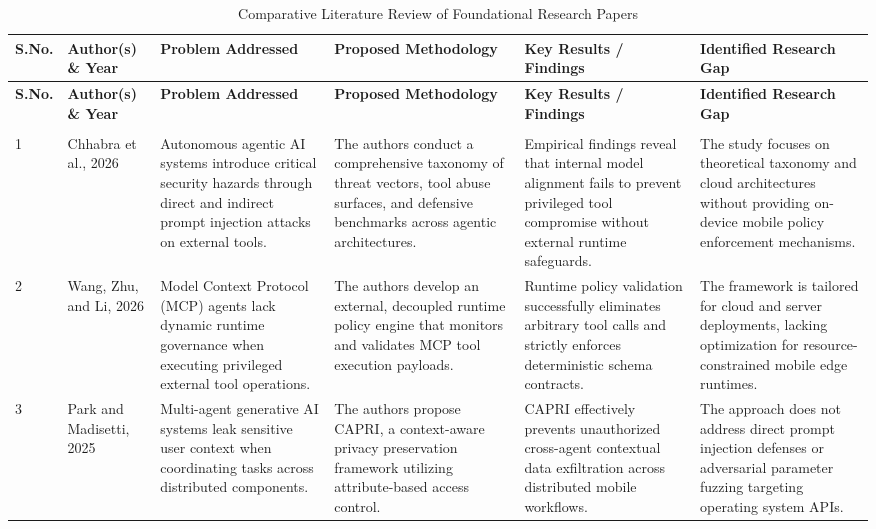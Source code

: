 \begin{center}
\footnotesize
\setlength{\tabcolsep}{2.2pt}
\renewcommand{\arraystretch}{1.25}

\begin{longtable}{|>{\centering\arraybackslash}p{0.55cm}|p{2.0cm}|p{2.7cm}|p{2.8cm}|p{2.7cm}|p{2.7cm}|}
\caption{Comparative Literature Review of Foundational Research Papers}
\label{tab:literature_review}\\
\hline
\textbf{S.No.} & \textbf{Author(s) \& Year} & \textbf{Problem Addressed} & \textbf{Proposed Methodology} & \textbf{Key Results / Findings} & \textbf{Identified Research Gap} \\
\hline
\endfirsthead

\hline
\textbf{S.No.} & \textbf{Author(s) \& Year} & \textbf{Problem Addressed} & \textbf{Proposed Methodology} & \textbf{Key Results / Findings} & \textbf{Identified Research Gap} \\
\hline
\endhead

\hline
\multicolumn{6}{|r|}{\textit{Continued on next page...}} \\
\hline
\endfoot

\hline
\endlastfoot

1 & Chhabra et al., 2026 \cite{chhabra2026agentic} & Autonomous agentic AI systems introduce critical security hazards through direct and indirect prompt injection attacks on external tools. & The authors conduct a comprehensive taxonomy of threat vectors, tool abuse surfaces, and defensive benchmarks across agentic architectures. & Empirical findings reveal that internal model alignment fails to prevent privileged tool compromise without external runtime safeguards. & The study focuses on theoretical taxonomy and cloud architectures without providing on-device mobile policy enforcement mechanisms. \\
\hline

2 & Wang, Zhu, and Li, 2026 \cite{wang2026runtime} & Model Context Protocol (MCP) agents lack dynamic runtime governance when executing privileged external tool operations. & The authors develop an external, decoupled runtime policy engine that monitors and validates MCP tool execution payloads. & Runtime policy validation successfully eliminates arbitrary tool calls and strictly enforces deterministic schema contracts. & The framework is tailored for cloud and server deployments, lacking optimization for resource-constrained mobile edge runtimes. \\
\hline

3 & Park and Madisetti, 2025 \cite{park2025capri} & Multi-agent generative AI systems leak sensitive user context when coordinating tasks across distributed components. & The authors propose CAPRI, a context-aware privacy preservation framework utilizing attribute-based access control. & CAPRI effectively prevents unauthorized cross-agent contextual data exfiltration across distributed mobile workflows. & The approach does not address direct prompt injection defenses or adversarial parameter fuzzing targeting operating system APIs. \\
\hline


\end{longtable}
\end{center}
